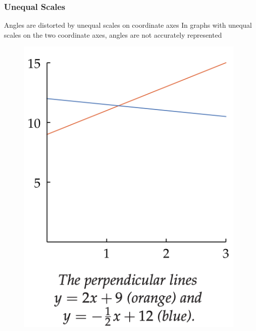 \documentclass{beamer}
\begin{document}
  \begin{frame}
    \frametitle{Unequal Scales}
    \begin{alertblock}{Angles are distorted by unequal scales on coordinate axes}
      In graphs with unequal scales on the two coordinate axes, angles are not
      accurately represented
    \end{alertblock}
    \begin{figure}
      \centering
      \includegraphics[scale=0.25]{unequal-scale.png}
    \end{figure}
  \end{frame}
\end{document}
